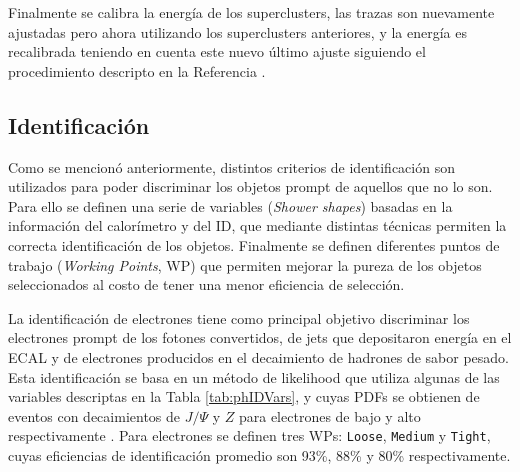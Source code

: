 Finalmente se calibra la energía de los superclusters, las trazas son nuevamente ajustadas pero ahora utilizando los superclusters anteriores, y la energía es recalibrada teniendo en cuenta este nuevo último ajuste siguiendo el procedimiento descripto en la Referencia \cite{PERF-2017-03}.


\subsection{Identificación}\label{sec:ph_id}

Como se mencionó anteriormente, distintos criterios de identificación son utilizados para poder discriminar los objetos prompt
de aquellos que no lo son. Para ello se definen una serie de variables (\textit{Shower shapes}) basadas en la información del calorímetro y del ID, que mediante distintas técnicas permiten la correcta identificación de los objetos. Finalmente se definen diferentes puntos de trabajo (\textit{Working Points}, WP) que permiten mejorar la pureza de los objetos seleccionados al costo de tener una menor eficiencia de selección.

La identificación de electrones tiene como principal objetivo discriminar los electrones prompt de los fotones convertidos, de jets que depositaron energía en el ECAL y de electrones producidos en el decaimiento de hadrones de sabor pesado. Esta identificación se basa en un método de likelihood que utiliza algunas de las variables descriptas en la Tabla \ref{tab:phIDVars}, y cuyas PDFs se obtienen de eventos con decaimientos de $J/\Psi$ y $Z$ para electrones de bajo y alto \ET respectivamente \cite{PERF-2016-01}. Para electrones se definen tres WPs: \texttt{Loose}, \texttt{Medium} y \texttt{Tight}, cuyas eficiencias de identificación promedio son  93\%, 88\% y 80\% respectivamente.

